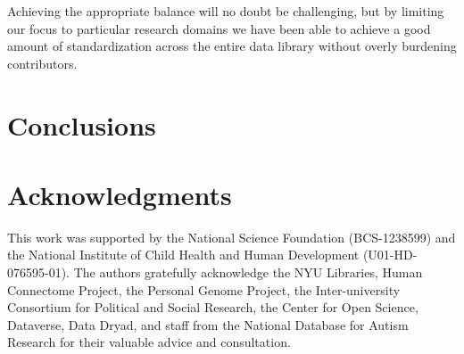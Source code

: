 \documentclass{sig-alternate}
\begin{document}
Achieving the appropriate balance will no doubt be challenging, but by limiting our focus to particular research domains we have been able to achieve a good amount of standardization across the entire data library without overly burdening contributors.


\section{Conclusions}

\section*{Acknowledgments}

This work was supported by the National Science Foundation (BCS-1238599)
and the National Institute of Child Health and Human Development
(U01-HD-076595-01). The authors gratefully acknowledge the NYU
Libraries, Human Connectome Project, the Personal Genome Project, the
Inter-university Consortium for Political and Social Research, the
Center for Open Science, Dataverse, Data Dryad, and staff from the
National Database for Autism Research for their valuable advice and
consultation.



\end{document}
